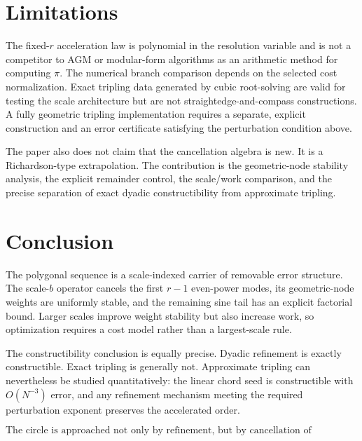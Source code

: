 \documentclass[11pt]{article}
\theoremstyle{remark}
\begin{document}
\section{Limitations}

The fixed-$r$ acceleration law is polynomial in the resolution variable and
is not a competitor to AGM or modular-form algorithms as an arithmetic method
for computing $\pi$.  The numerical branch comparison depends on the selected
cost normalization.  Exact tripling data generated by cubic root-solving are
valid for testing the scale architecture but are not straightedge-and-compass
constructions.  A fully geometric tripling implementation requires a separate,
explicit construction and an error certificate satisfying the perturbation
condition above.

The paper also does not claim that the cancellation algebra is new.  It is a
Richardson-type extrapolation.  The contribution is the geometric-node
stability analysis, the explicit remainder control, the scale/work comparison,
and the precise separation of exact dyadic constructibility from approximate
tripling.

\section{Conclusion}

The polygonal sequence is a scale-indexed carrier of removable error
structure.  The scale-$b$ operator cancels the first $r-1$ even-power modes,
its geometric-node weights are uniformly stable, and the remaining sine tail
has an explicit factorial bound.  Larger scales improve weight stability but
also increase work, so optimization requires a cost model rather than a
largest-scale rule.

The constructibility conclusion is equally precise.  Dyadic refinement is
exactly constructible.  Exact tripling is generally not.  Approximate tripling
can nevertheless be studied quantitatively: the linear chord seed is
constructible with $O(N^{-3})$ error, and any refinement mechanism meeting the
required perturbation exponent preserves the accelerated order.

\[
  \boxed{\text{The circle is approached not only by refinement, but by
  cancellation of refinement error.}}
\]
\end{document}
